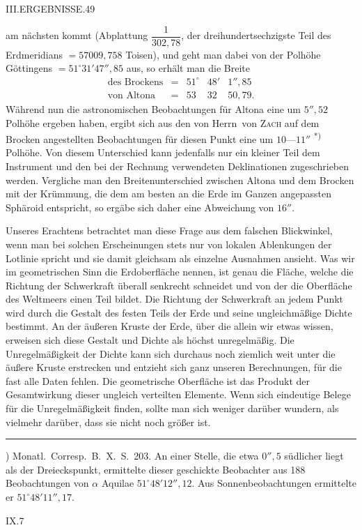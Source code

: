\clearpage
\noindent\mbox{}\hfill III.\quad ERGEBNISSE.\hfill 49\par
\noindent{} am nächsten kommt (Abplattung $\dfrac1{302{,}78}$, der dreihundertsechzigste Teil des Erdmeridians $=57009{,}758$ Toisen), und geht man dabei von der Polhöhe Göttingens $=51^\circ31'47''{,}85$ aus, so erhält man die Breite
\[
\begin{array}{lcrrr}
\text{des Brockens}&=&51^\circ&48'&1''{,}85\\
\text{von Altona}&=&53&32&50{,}79.
\end{array}
\]
Während nun die astronomischen Beobachtungen für Altona eine um $5''{,}52$  Polhöhe ergeben haben, ergibt sich aus den von Herrn\ von \textsc{Zach} auf dem Brocken angestellten Beobachtungen für diesen Punkt eine um $10\text{—}11''$ \textsuperscript{*)} Polhöhe. Von diesem Unterschied kann jedenfalls nur ein kleiner Teil dem Instrument und den bei der Rechnung verwendeten Deklinationen zugeschrieben werden. Vergliche man den Breitenunterschied zwischen Altona und dem Brocken mit der Krümmung, die dem am besten an die Erde im Ganzen angepassten Sphäroid entspricht, so ergäbe sich daher eine Abweichung von $16''$.

Unseres Erachtens betrachtet man diese Frage aus dem falschen Blickwinkel, wenn man bei solchen Erscheinungen stets nur von lokalen Ablenkungen der Lotlinie spricht und sie damit gleichsam als einzelne Ausnahmen ansieht. Was wir im geometrischen Sinn die Erdoberfläche nennen, ist genau die Fläche, welche die Richtung der Schwerkraft überall senkrecht schneidet und von der die Oberfläche des Weltmeers einen Teil bildet. Die Richtung der Schwerkraft an jedem Punkt wird durch die Gestalt des festen Teils der Erde und seine ungleichmäßige Dichte bestimmt. An der äußeren Kruste der Erde, über die allein wir etwas wissen, erweisen sich diese Gestalt und Dichte als höchst unregelmäßig. Die Unregelmäßigkeit der Dichte kann sich durchaus noch ziemlich weit unter die äußere Kruste erstrecken und entzieht sich ganz unseren Berechnungen, für die fast alle Daten fehlen. Die geometrische Oberfläche ist das Produkt der Gesamtwirkung dieser ungleich verteilten Elemente. Wenn sich eindeutige Belege für die Unregelmäßigkeit finden, sollte man sich weniger darüber wundern, als vielmehr darüber, dass sie nicht noch größer ist.
\par\noindent\rule{.25\textwidth}{.4pt}\par
{\footnotesize *) Monatl.\ Corresp.\ B.\ X.\ S.\ 203. An einer Stelle, die etwa $0''{,}5$ südlicher liegt als der Dreieckspunkt, ermittelte dieser geschickte Beobachter aus 188 Beobachtungen von $\alpha$ Aquilae $51^\circ48'12''{,}12$. Aus Sonnenbeobachtungen ermittelte er $51^\circ48'11''{,}17$.\par}
\noindent IX.\hfill 7\par

